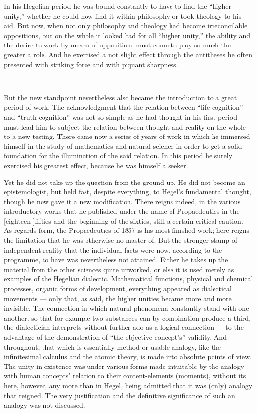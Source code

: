 \documentclass[12pt,a4paper]{book}
\newcommand{\opage}[1]{\marginnote{\footnotesize\textit{[#1]}}}
\begin{document}
In his Hegelian period he was bound constantly to have to find the ``higher unity,'' whether he
could now find it within philosophy or took theology to his aid. But now, when not only
philosophy and theology had become irreconcilable oppositions, but on the whole it looked bad
for all ``higher unity,'' the ability and the desire to work by means of oppositions must come
to play so much the greater a role. And he exercised a not slight effect through the antitheses
he often presented with striking force and with piquant sharpness.

\begin{center}---\end{center}

But the new standpoint nevertheless also became the introduction to a great period of work. The
acknowledgment that the relation between ``life-cognition'' and ``truth-cognition'' was not so
simple as he had thought in his first period must lead him to subject the relation between
thought and reality on the whole to a new testing. There came now a series of years of work in
which he immersed himself in the study of mathematics and natural science in order to get a
solid foundation for the illumination of the said relation. In this period he surely exercised
his greatest effect, because he was himself a seeker.

Yet he did not take up the question from the ground up. He did not become an epistemologist,
but held fast, despite everything, to Hegel's fundamental thought, though he now gave it a new
modification. There reigns indeed, in the various introductory works that he published under
the name of Propaedeutics in the [eighteen-]fifties and the beginning of the sixties, still a
certain critical caution. As regards form, the Propaedeutics of 1857 is his most finished work;
here reigns the limitation that he was otherwise no master of. But the stronger stamp of
independent reality that \opage{189}the individual facts were now, according to the programme, to have was
nevertheless not attained. Either he takes up the material from the other sciences quite
unworked, or else it is used merely as examples of the Hegelian dialectic. Mathematical
functions, physical and chemical processes, organic forms of development, everything appeared as
dialectical movements --- only that, as said, the higher unities became more and more invisible.
The connection in which natural phenomena constantly stand with one another, so that for example
two substances can by combination produce a third, the dialectician interprets without further
ado as a logical connection --- to the advantage of the demonstration of ``the objective
concept's'' validity. And throughout, that which is essentially method or usable analogy, like
the infinitesimal calculus and the atomic theory, is made into absolute points of view. The
unity in existence was under various forms made intuitable by the analogy with human concepts'
relation to their content-elements (moments), without its here, however, any more than in Hegel,
being admitted that it was (only) analogy that reigned. The very justification and the
definitive significance of such an analogy was not discussed.
\end{document}
